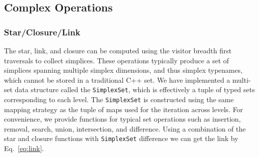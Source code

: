 	\subsection{Complex Operations}
	\subsubsection{Star/Closure/Link}
		\par The star, link, and closure can be computed using the visitor breadth first traversals to collect simplices. These operations typically produce a set of simplices spanning multiple simplex dimensions, and thus simplex typenames, which cannot be stored in a traditional C++ set. We have implemented a multi-set data structure called the \verb|SimplexSet|, which is effectively a tuple of typed sets corresponding to each level. The \verb|SimplexSet| is constructed using the same mapping strategy as the tuple of maps used for the iteration across levels. For convenience, we provide functions for typical set operations such as insertion, removal, search, union, intersection, and difference. Using a combination of the star and closure functions with \verb|SimplexSet| difference we can get the link by Eq.~\ref{eq:link}.

